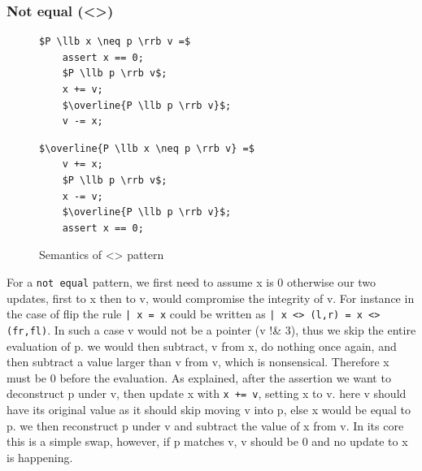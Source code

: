 \documentclass[a4paper]{article}
\begin{document}
\subsubsection{Not equal (<>)}
\label{sec:orgc304eb4}
\begin{figure}[!htb]
\begin{minipage}{0.4\textwidth}
\begin{lstlisting}
$P \llb x \neq p \rrb v =$
    assert x == 0;
    $P \llb p \rrb v$;
    x += v;
    $\overline{P \llb p \rrb v}$;
    v -= x;
\end{lstlisting}
\end{minipage}
\qquad
\begin{minipage}{0.4\textwidth}
\begin{lstlisting}
$\overline{P \llb x \neq p \rrb v} =$
    v += x;
    $P \llb p \rrb v$;
    x -= v;
    $\overline{P \llb p \rrb v}$;
    assert x == 0;
\end{lstlisting}
\end{minipage}

\caption{Semantics of <> pattern}
\label{Neq}
\end{figure}

For a \texttt{not equal} pattern, we first need to assume x is 0 otherwise our two updates, first to x then to v, would compromise the integrity of v. For instance in the case of flip the rule \texttt{| x = x} could be written as \texttt{| x <> (l,r) = x <> (fr,fl)}. In such a case v would not be a pointer (v !\& 3), thus we skip the entire evaluation of p. we would then subtract, v from x, do nothing once again, and then subtract a value larger than v from v, which is nonsensical. Therefore x must be 0 before the evaluation. As explained, after the assertion we want to deconstruct p under v, then update x with \texttt{x += v}, setting x to v. here v should have its original value as it should skip moving v into p, else x would be equal to p. we then reconstruct p under v and subtract the value of x from v. In its core this is a simple swap, however, if p matches v, v should be 0 and no update to x is happening.
\end{document}
